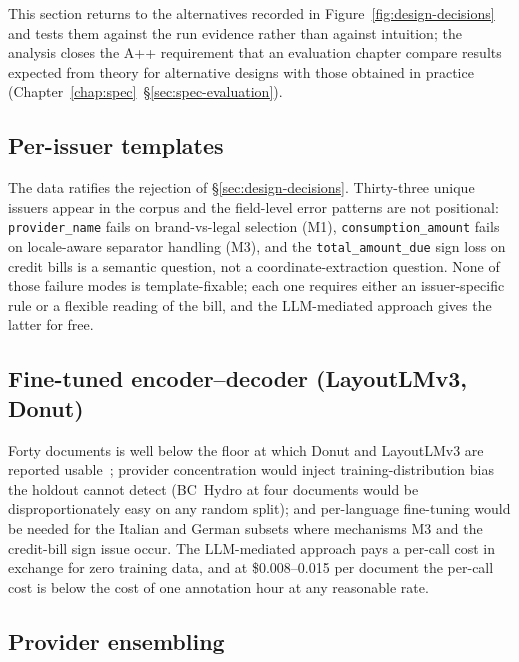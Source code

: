 This section returns to the alternatives recorded in
Figure~\ref{fig:design-decisions} and tests them against the run
evidence rather than against intuition; the analysis closes the
A++ requirement that an evaluation chapter compare results expected
from theory for alternative designs with those obtained in
practice (Chapter~\ref{chap:spec}~\S\ref{sec:spec-evaluation}).

\subsection{Per-issuer templates}
\label{sec:eval-alternatives-templates}

The data ratifies the rejection of \S\ref{sec:design-decisions}.
Thirty-three unique issuers appear in the corpus and the field-level
error patterns are not positional: \texttt{provider\_name} fails on
brand-vs-legal selection (M1), \texttt{consumption\_amount} fails on
locale-aware separator handling (M3), and the
\texttt{total\_amount\_due} sign loss on credit bills is a semantic
question, not a coordinate-extraction question. None of those failure
modes is template-fixable; each one requires either an
issuer-specific rule or a flexible reading of the bill, and the
LLM-mediated approach gives the latter for free.

\subsection{Fine-tuned encoder--decoder (LayoutLMv3, Donut)}
\label{sec:eval-alternatives-finetune}

Forty documents is well below the floor at which Donut and
LayoutLMv3 are reported usable~\cite{kim2022donut,huang2022layoutlmv3};
provider concentration would inject training-distribution bias the
holdout cannot detect (BC~Hydro at four documents would be
disproportionately easy on any random split); and per-language
fine-tuning would be needed for the Italian and German subsets where
mechanisms M3 and the credit-bill sign issue occur. The LLM-mediated
approach pays a per-call cost in exchange for zero training data,
and at \$0.008--0.015 per document the per-call cost is below the
cost of one annotation hour at any reasonable rate.

\subsection{Provider ensembling}
\label{sec:eval-alternatives-ensemble}

